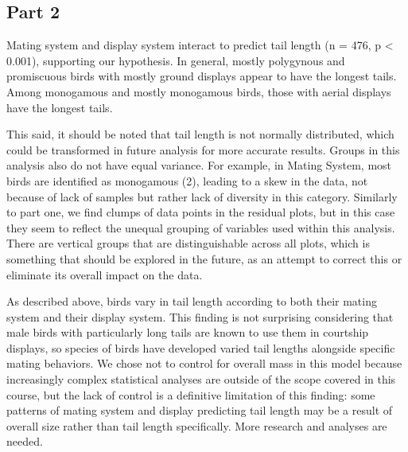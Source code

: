 \documentclass[
  12pt,
]{article}
\begin{document}
\newpage

\hypertarget{part-2}{%
\subsection{Part 2}\label{part-2}}

Mating system and display system interact to predict tail length (n =
476, p \textless{} 0.001), supporting our hypothesis. In general, mostly
polygynous and promiscuous birds with mostly ground displays appear to
have the longest tails. Among monogamous and mostly monogamous birds,
those with aerial displays have the longest tails.

This said, it should be noted that tail length is not normally
distributed, which could be transformed in future analysis for more
accurate results. Groups in this analysis also do not have equal
variance. For example, in Mating System, most birds are identified as
monogamous (2), leading to a skew in the data, not because of lack of
samples but rather lack of diversity in this category. Similarly to part
one, we find clumps of data points in the residual plots, but in this
case they seem to reflect the unequal grouping of variables used within
this analysis. There are vertical groups that are distinguishable across
all plots, which is something that should be explored in the future, as
an attempt to correct this or eliminate its overall impact on the data.

As described above, birds vary in tail length according to both their
mating system and their display system. This finding is not surprising
considering that male birds with particularly long tails are known to
use them in courtship displays, so species of birds have developed
varied tail lengths alongside specific mating behaviors. We chose not to
control for overall mass in this model because increasingly complex
statistical analyses are outside of the scope covered in this course,
but the lack of control is a definitive limitation of this finding: some
patterns of mating system and display predicting tail length may be a
result of overall size rather than tail length specifically. More
research and analyses are needed.
\end{document}
